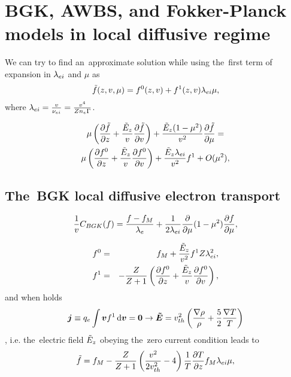 \section{BGK, AWBS, and Fokker-Planck models in local diffusive regime}
\label{sec:DiffusiveKinetics}

We can try to find an~approximate solution while using the~first term of
expansion in $\lambda_{ei}$ and $\mu$ as
\begin{equation}
  \tilde{f}(z, v, \mu) = f^0(z, v) + f^1(z, v) \lambda_{ei}\mu ,
  \label{eq:f_approximation}
\end{equation}
where $\lambda_{ei} = \frac{v}{\nu_{ei}} = \frac{v^4}{Z n_e \Gamma}$.

\begin{multline}
  \mu\left(\frac{\partial{\tilde{f}}}{\partial{z}} + \frac{\tilde{E}_z}{v}\frac{\partial{\tilde{f}}}{\partial{v}}\right) 
  + \frac{\tilde{E}_z(1-\mu^2)}{v^2}\frac{\partial{\tilde{f}}}{\partial{\mu}} = \\
  \mu\left(\frac{\partial{f^0}}{\partial{z}} + \frac{\tilde{E}_z}{v}\frac{\partial{f^0}}{\partial{v}}\right) 
  + \frac{\tilde{E}_z\lambda_{ei}}{v^2} f^1 + O(\mu^2) ,
  \nonumber
\end{multline}

\subsection{The~BGK local diffusive electron transport}
\label{sec:BGKDiffusiveRegime}

\begin{equation}
  \frac{1}{v}C_{BGK}(f)
  =
  \frac{f - f_M}{\lambda_e}
  + \frac{1}{2 \lambda_{ei}}
  \frac{\partial{}}{\partial{\mu}}(1 - \mu^2)\frac{\partial{f}}{\partial{\mu}} ,
  \label{eq:OOE_AWBS_model_1D}
\end{equation}

\begin{eqnarray}
  f^0 &=& f_M + \frac{\tilde{E}_z}{v^2}f^1 Z\lambda_{ei}^2 ,
  \label{eq:BGK_f0} \\
  f^1 &=& - \frac{Z}{Z+1}
  \left( \frac{\partial{f^0}}{\partial{z}} + \frac{\tilde{E}_z}{v}\frac{\partial{f^0}}{\partial{v}} \right) , 
  \label{eq:BGK_f1}
\end{eqnarray}
and when holds 
\begin{multline}
\boldsymbol{j} \equiv q_e \int \boldsymbol{v} f^1 \, \text{d}\boldsymbol{v} = \boldsymbol{0}  \rightarrow
\boldsymbol{\tilde{E}} = v_{th}^2\left(\frac{\nabla\rho}{\rho} + \frac{5}{2}\frac{\nabla T}{T} 
\right)
\nonumber
\end{multline}
, i.e. the~electric field $\tilde{E}_z$ obeying the~zero current condition leads to
\begin{equation}
  \tilde{f} = f_M - \frac{Z}{Z+1}
  \left( \frac{v^2}{2 v_{th}^2} - 4\right)
  \frac{1}{T}\frac{\partial{T}}{\partial{z}}f_M \lambda_{ei} \mu , 
  \nonumber
\end{equation}


